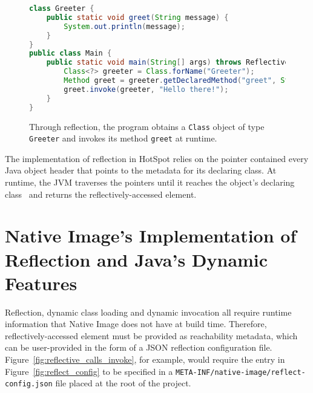 \begin{figure}[ht]
    \centering
\begin{lstlisting}[language=Java]
class Greeter {
    public static void greet(String message) { 
        System.out.println(message); 
    }
}
public class Main {
    public static void main(String[] args) throws ReflectiveOperationException {
        Class<?> greeter = Class.forName("Greeter");
        Method greet = greeter.getDeclaredMethod("greet", String.class);
        greet.invoke(greeter, "Hello there!");
    }   
}
\end{lstlisting}
    \caption{Through reflection, the program obtains a \texttt{Class} object of type \texttt{Greeter} and invokes its method \texttt{greet} at runtime.}
    \label{fig:reflective_calls}
\end{figure}

The implementation of reflection in HotSpot relies on the pointer contained every Java object header that points to the metadata for its declaring class. At runtime, the JVM traverses the pointers until it reaches the object's declaring class~\cite{evans_ben_reflection_nodate} and returns the reflectively-accessed element.

\section{Native Image's Implementation of Reflection and Java's Dynamic Features}
Reflection, dynamic class loading and dynamic invocation all require runtime information that Native Image does not have at build time. Therefore, reflectively-accessed element must be provided as reachability metadata, which can be user-provided in the form of a JSON reflection configuration file.  
Figure~\ref{fig:reflective_calls_invoke}, for example, would require the entry in Figure~\ref{fig:reflect_config} to be specified in a \verb|META-INF/native-image/reflect-config.json| file placed at the root of the project.

